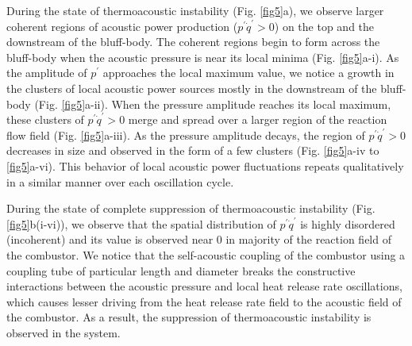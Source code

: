 \documentclass[twocolumn,10pt]{article} %
\begin{document}
During the state of thermoacoustic instability (Fig. \ref{fig5}a), we observe larger coherent regions of  acoustic power production ($p^\prime\dot{q}^\prime>0$) on the top and the downstream of the bluff-body. The coherent regions begin to form across the bluff-body when the acoustic pressure is near its local minima (Fig. \ref{fig5}a-i). As the amplitude of $p^\prime$ approaches the local maximum value, we notice a growth in the clusters of local acoustic power sources mostly in the downstream of the bluff-body (Fig. \ref{fig5}a-ii). When the pressure amplitude reaches its local maximum, these clusters of $p^\prime\dot{q}^\prime>0$ merge and spread over a larger region of the reaction flow field (Fig. \ref{fig5}a-iii). As the pressure amplitude decays, the region of $p^\prime\dot{q}^\prime>0$ decreases in size and observed in the form of a few clusters (Fig. \ref{fig5}a-iv to \ref{fig5}a-vi). This behavior of local acoustic power fluctuations repeats qualitatively in a similar manner over each oscillation cycle.  %

During the state of complete suppression of thermoacoustic instability (Fig. \ref{fig5}b(i-vi)), %
we observe that the spatial distribution of $p^\prime\dot{q}^\prime$ is highly disordered (incoherent) and its value is observed near 0 in majority of the reaction field of the combustor. We notice that the self-acoustic coupling of the combustor using a coupling tube of particular length and diameter breaks the constructive interactions between the acoustic pressure and local heat release rate oscillations, which causes lesser driving from the heat release rate field to the acoustic field of the combustor. As a result, the suppression of thermoacoustic instability is observed in the system. %
\end{document}
